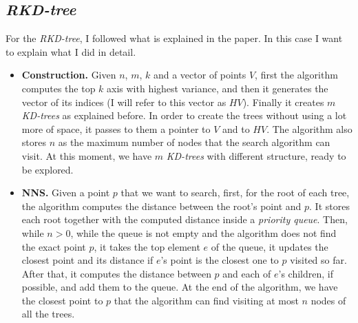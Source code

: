 \subsection{\textit{RKD-tree}}
For the \textit{RKD-tree}, I followed what is explained in the paper. In this case I want to explain what I did in detail.
\begin{itemize}
    \item \textbf{Construction.} Given $n$, $m$, $k$ and a vector of points $V$, first the algorithm computes the top $k$ axis with highest variance, and then it generates the vector of its indices (I will refer to this vector as $HV$). Finally it creates $m$ \textit{KD-trees} as explained before. In order to create the trees without using a lot more of space, it passes to them a pointer to $V$ and to $HV$. The algorithm also stores $n$ as the maximum number of nodes that the search algorithm can visit. At this moment, we have $m$ \textit{KD-trees} with different structure, ready to be explored.
    \item \textbf{NNS.} Given a point $p$ that we want to search, first, for the root of each tree, the algorithm computes the distance between the root's point and $p$. It stores each root together with the computed distance inside a \textit{priority queue}. Then, while $n > 0$, while the queue is not empty and the algorithm does not find the exact point $p$, it takes the top element $e$ of the queue, it updates the closest point and its distance if $e$'s point is the closest one to $p$ visited so far. After that, it computes the distance between $p$ and each of $e$'s children, if possible, and add them to the queue. At the end of the algorithm, we have the closest point to $p$ that the algorithm can find visiting at most $n$ nodes of all the trees.
\end{itemize}